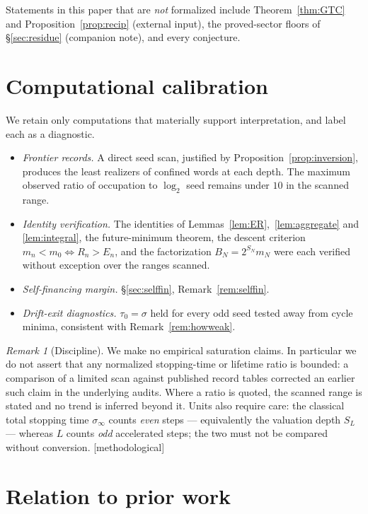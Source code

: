 \documentclass[11pt]{article}
\theoremstyle{plain}
\theoremstyle{definition}
\theoremstyle{remark}
\newtheorem{remark}[theorem]{Remark}
\newcommand{\status}[1]{\textsf{\footnotesize[#1]}}
\begin{document}
Statements in this paper that are \emph{not} formalized include Theorem~\ref{thm:GTC} and
Proposition~\ref{prop:recip} (external input), the proved-sector floors of \S\ref{sec:residue}
(companion note), and every conjecture.

\section{Computational calibration}\label{sec:comp}

We retain only computations that materially support interpretation, and label each as a
diagnostic.

\begin{itemize}[leftmargin=1.4em]
\item \emph{Frontier records.} A direct seed scan, justified by Proposition~\ref{prop:inversion},
  produces the least realizers of confined words at each depth. The maximum observed ratio of
  occupation to $\log_2$ seed remains under $10$ in the scanned range.
\item \emph{Identity verification.} The identities of Lemmas~\ref{lem:ER},~\ref{lem:aggregate} and
  \ref{lem:integral}, the future-minimum theorem, the descent criterion $m_n<m_0\iff R_n>E_n$, and
  the factorization $B_N=2^{S_N}m_N$ were each verified without exception over the ranges scanned.
\item \emph{Self-financing margin.} \S\ref{sec:selffin}, Remark~\ref{rem:selffin}.
\item \emph{Drift-exit diagnostics.} $\tau_0=\sigma$ held for every odd seed tested away from cycle
  minima, consistent with Remark~\ref{rem:howweak}.
\end{itemize}

\begin{remark}[Discipline]\label{rem:compdiscipline}
We make no empirical saturation claims. In particular we do not assert that any normalized
stopping-time or lifetime ratio is bounded: a comparison of a limited scan against published record
tables corrected an earlier such claim in the underlying audits. Where a ratio is quoted, the
scanned range is stated and no trend is inferred beyond it. Units also require care: the classical
total stopping time $\sigma_\infty$ counts \emph{even} steps --- equivalently the valuation depth
$S_L$ --- whereas $L$ counts \emph{odd} accelerated steps; the two must not be compared without
conversion. \status{methodological}
\end{remark}

\section{Relation to prior work}\label{sec:prior}
\end{document}
